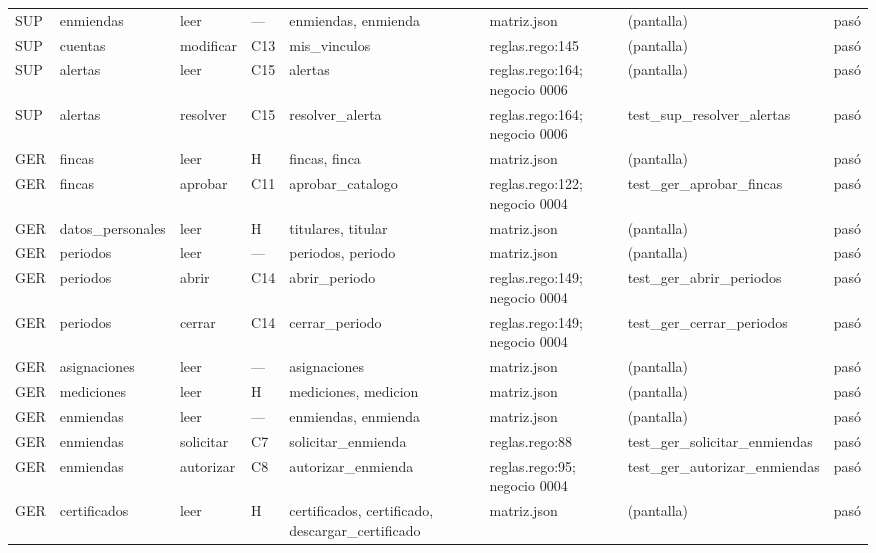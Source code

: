 \documentclass[11pt,letterpaper]{article}
\begin{document}
\begin{center}
\begin{longtable}{@{}p{0.6cm} p{1.7cm} p{1.2cm} p{0.9cm} p{3.4cm} p{2.6cm} p{3.4cm} p{0.8cm}@{}}
SUP & enmiendas & leer & — & enmiendas, \allowbreak{}enmienda & matriz.json & (pantalla) & pasó \\
SUP & cuentas & modificar & C13 & mis\_vinculos & reglas.rego:145 & (pantalla) & pasó \\
SUP & alertas & leer & C15 & alertas & reglas.rego:164; negocio 0006 & (pantalla) & pasó \\
SUP & alertas & resolver & C15 & resolver\_alerta & reglas.rego:164; negocio 0006 & test\_\allowbreak{}sup\_\allowbreak{}resolver\_\allowbreak{}alertas & pasó \\
GER & fincas & leer & H & fincas, \allowbreak{}finca & matriz.json & (pantalla) & pasó \\
GER & fincas & aprobar & C11 & aprobar\_catalogo & reglas.rego:122; negocio 0004 & test\_\allowbreak{}ger\_\allowbreak{}aprobar\_\allowbreak{}fincas & pasó \\
GER & datos\_\allowbreak{}personales & leer & H & titulares, \allowbreak{}titular & matriz.json & (pantalla) & pasó \\
GER & periodos & leer & — & periodos, \allowbreak{}periodo & matriz.json & (pantalla) & pasó \\
GER & periodos & abrir & C14 & abrir\_periodo & reglas.rego:149; negocio 0004 & test\_\allowbreak{}ger\_\allowbreak{}abrir\_\allowbreak{}periodos & pasó \\
GER & periodos & cerrar & C14 & cerrar\_periodo & reglas.rego:149; negocio 0004 & test\_\allowbreak{}ger\_\allowbreak{}cerrar\_\allowbreak{}periodos & pasó \\
GER & asignaciones & leer & — & asignaciones & matriz.json & (pantalla) & pasó \\
GER & mediciones & leer & H & mediciones, \allowbreak{}medicion & matriz.json & (pantalla) & pasó \\
GER & enmiendas & leer & — & enmiendas, \allowbreak{}enmienda & matriz.json & (pantalla) & pasó \\
GER & enmiendas & solicitar & C7 & solicitar\_enmienda & reglas.rego:88 & test\_\allowbreak{}ger\_\allowbreak{}solicitar\_\allowbreak{}enmiendas & pasó \\
GER & enmiendas & autorizar & C8 & autorizar\_enmienda & reglas.rego:95; negocio 0004 & test\_\allowbreak{}ger\_\allowbreak{}autorizar\_\allowbreak{}enmiendas & pasó \\
GER & certificados & leer & H & certificados, \allowbreak{}certificado, \allowbreak{}descargar\_certificado & matriz.json & (pantalla) & pasó \\

\end{longtable}
\end{center}
\end{document}
